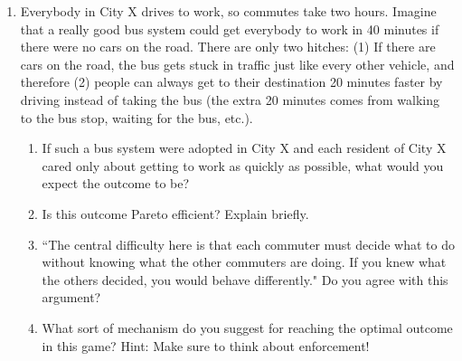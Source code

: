 \begin{enumerate}




\item\label{commutegame} Everybody in City X drives to work, so commutes take two hours. Imagine that a really good bus system could get everybody to work in 40 minutes if there were no cars on the road. There are only two hitches: (1) If there are cars on the road, the bus gets stuck in traffic just like every other vehicle, and therefore (2) people can always get to their destination 20 minutes faster by driving instead of taking the bus (the extra 20 minutes comes from walking to the bus stop, waiting for the bus, etc.).

    \begin{enumerate}
    \item If such a bus system were adopted in City X and each resident of City X cared only about getting to work as quickly as possible, what would you expect the outcome to be?


    \item Is this outcome Pareto efficient? Explain briefly.


    \item ``The central difficulty here is that each commuter must decide what to do without knowing what the other commuters are doing. If you knew what the others decided, you would behave differently." Do you agree with this argument?%



    \item What sort of mechanism do you suggest for reaching the optimal outcome in this game? Hint: Make sure to think about enforcement!

    \end{enumerate}











\end{enumerate}
